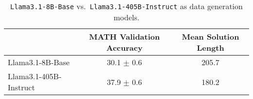 \begin{table*}[t]
    \setlength{\tabcolsep}{4pt}
    \centering
    \caption{\texttt{Llama3.1-8B-Base} vs.\ \texttt{Llama3.1-405B-Instruct} as data generation models. 
    }
    \begin{tabular}{lcc}
    \toprule
        &   MATH Validation Accuracy &  Mean Solution Length \\ \midrule
    Llama3.1-8B-Base & 30.1 $\pm$ 0.6  & 205.7 \\ 
    Llama3.1-405B-Instruct & 37.9 $\pm$ 0.6 & 180.2 \\ 
    
\bottomrule 
    \end{tabular}
    \label{tab:teacher_model}
\end{table*}
